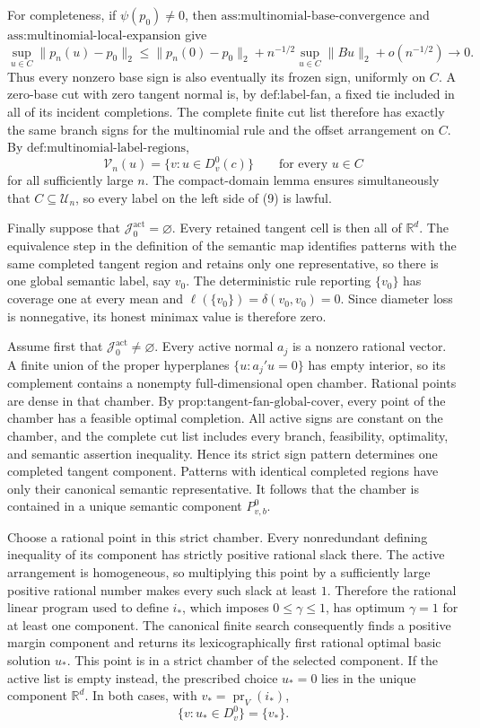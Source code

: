 For completeness, if \(\psi(p_0)\ne0\), then
\(\text{ass:multinomial-base-convergence}\) and
\(\text{ass:multinomial-local-expansion}\) give
\[
 \sup_{u\in C}\|p_n(u)-p_0\|_2
 \leq \|p_n(0)-p_0\|_2
 +n^{-1/2}\sup_{u\in C}\|Bu\|_2+o(n^{-1/2})
 \longrightarrow0.
\tag{8}
\]
Thus every nonzero base sign is also eventually its frozen sign,
uniformly on \(C\).  A zero-base cut with zero tangent normal is, by
\(\text{def:label-fan}\), a fixed tie included in all of its incident
completions.  The complete finite cut list therefore has exactly the
same branch signs for the multinomial rule and the offset arrangement
on \(C\).  By \(\text{def:multinomial-label-regions}\),
\[
 \mathcal V_n(u)=\{v:u\in D_v^0(c)\}
 \qquad\text{for every \(u\in C\)}
\tag{9}
\]
for all sufficiently large \(n\).  The compact-domain lemma ensures
simultaneously that \(C\subseteq\mathcal U_n\), so every label on the
left side of (9) is lawful.

Finally suppose that
\(\mathcal J_0^{\mathrm{act}}=\varnothing\).  Every retained tangent
cell is then all of \(\mathbb R^d\).  The equivalence step in the
definition of the semantic map identifies patterns with the same
completed tangent region and retains only one representative, so there
is one global semantic label, say \(v_0\).  The deterministic rule
reporting \(\{v_0\}\) has coverage one at every mean and
\(\ell(\{v_0\})=\delta(v_0,v_0)=0\).  Since diameter loss is
nonnegative, its honest minimax value is therefore zero.

Assume first that
\(\mathcal J_0^{\mathrm{act}}\ne\varnothing\).  Every active normal
\(a_j\) is a nonzero rational vector.  A finite union of the proper
hyperplanes \(\{u:a_j'u=0\}\) has empty interior, so its complement
contains a nonempty full-dimensional open chamber.  Rational points
are dense in that chamber.  By
\(\text{prop:tangent-fan-global-cover}\), every point of the chamber
has a feasible optimal completion.  All active signs are constant on
the chamber, and the complete cut list includes every branch,
feasibility, optimality, and semantic assertion inequality.  Hence its
strict sign pattern determines one completed tangent component.
Patterns with identical completed regions have only their canonical
semantic representative.  It follows that the chamber is contained
in a unique semantic component \(P_{v,b}^0\).

Choose a rational point in this strict chamber.  Every nonredundant
defining inequality of its component has strictly positive rational
slack there.  The active arrangement is homogeneous, so multiplying
this point by a sufficiently large positive rational number makes
every such slack at least \(1\).  Therefore the rational linear
program used to define \(i_*\), which imposes
\(0\leq\gamma\leq1\), has optimum \(\gamma=1\) for at least one
component.  The canonical finite search consequently finds a positive
margin component and returns its lexicographically first rational
optimal basic solution \(u_*\).  This point is in a strict chamber of
the selected component.  If the active list is empty instead, the
prescribed choice \(u_*=0\) lies in the unique component
\(\mathbb R^d\).  In both cases, with
\(v_*=\operatorname{pr}_V(i_*)\),
\[
 \{v:u_*\in D_v^0\}=\{v_*\}.
\tag{10}
\]

